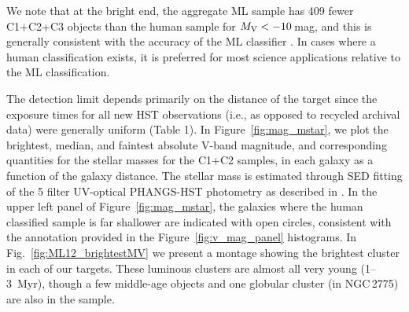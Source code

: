 \documentclass[linenumbers]{aastex63}
\begin{document}
We note that at the bright end, the aggregate ML sample has 409 fewer C1+C2+C3 objects than the human sample for $M_{\rm V} < -10$\,mag, and this is generally consistent with the accuracy of the ML classifier \citep{hannon_star_2023}.  In cases where a human classification exists, it is preferred for most science applications relative to the ML classification.


The detection limit depends primarily on the distance of the target since the exposure times for all new HST observations (i.e., as opposed to recycled archival data) were generally uniform (Table 1).  In Figure~\ref{fig:mag_mstar}, we plot the brightest, median, and faintest absolute V-band magnitude, and corresponding quantities for the stellar masses for the C1+C2 samples, in each galaxy as a function of the galaxy distance. The stellar mass is estimated through SED fitting of the 5 filter UV-optical PHANGS-HST photometry as described in \citet{thilker23sed}.
In the upper left panel of Figure~\ref{fig:mag_mstar}, the galaxies where the human classified sample is far shallower are indicated with open circles, consistent with the annotation provided in the Figure~\ref{fig:v_mag_panel} histograms. In Fig.~\ref{fig:ML12_brightestMV} we present a montage showing the brightest cluster in each of our targets.  These luminous clusters are almost all very young (1--3~Myr), though a few middle-age objects and one globular cluster (in NGC\,2775) are also in the sample.

\end{document}
